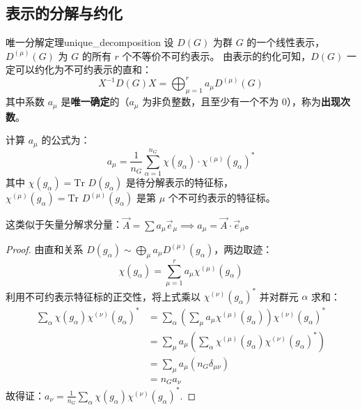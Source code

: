 \subsection{表示的分解与约化}

\begin{theorem}{唯一分解定理}{unique_decomposition}
    设 $D(G)$ 为群 $G$ 的一个线性表示，$D^{(\mu)}(G)$ 为 $G$ 的所有 $r$ 个不等价不可约表示。
    由表示的约化可知，$D(G)$ 一定可以约化为不可约表示的直和：
    \begin{equation}
        X^{-1}D(G)X = \bigoplus_{\mu=1}^r a_\mu D^{(\mu)}(G)
    \end{equation}
    其中系数 $a_\mu$ 是\textbf{唯一确定}的（$a_\mu$ 为非负整数，且至少有一个不为 0），称为\textbf{出现次数}。
    
    计算 $a_\mu$ 的公式为：
    \begin{equation}
        a_\mu = \frac{1}{n_G} \sum_{\alpha=1}^{n_G} \chi(g_\alpha) \cdot \chi^{(\mu)}(g_\alpha)^*
    \end{equation}
    其中 $\chi(g_\alpha) = \text{Tr } D(g_\alpha)$ 是待分解表示的特征标，$\chi^{(\mu)}(g_\alpha) = \text{Tr } D^{(\mu)}(g_\alpha)$ 是第 $\mu$ 个不可约表示的特征标。
    
    这类似于矢量分解求分量：$\vec{A} = \sum a_\mu \vec{e}_\mu \implies a_\mu = \vec{A} \cdot \vec{e}_\mu$。
\end{theorem}

\begin{proof}
    由直和关系 $D(g_\alpha) \sim \bigoplus_{\mu} a_\mu D^{(\mu)}(g_\alpha)$，两边取迹：
    \begin{equation}
        \chi(g_\alpha) = \sum_{\mu=1}^r a_\mu \chi^{(\mu)}(g_\alpha)
    \end{equation}
    利用不可约表示特征标的正交性，将上式乘以 $\chi^{(\nu)}(g_\alpha)^*$ 并对群元 $\alpha$ 求和：
    \begin{equation}
        \begin{aligned}
            \sum_{\alpha} \chi(g_\alpha) \chi^{(\nu)}(g_\alpha)^* &= \sum_{\alpha} \left( \sum_{\mu} a_\mu \chi^{(\mu)}(g_\alpha) \right) \chi^{(\nu)}(g_\alpha)^* \\
            &= \sum_{\mu} a_\mu \left( \sum_{\alpha} \chi^{(\mu)}(g_\alpha) \chi^{(\nu)}(g_\alpha)^* \right) \\
            &= \sum_{\mu} a_\mu (n_G \delta_{\mu\nu}) \\
            &= n_G a_\nu
        \end{aligned}
    \end{equation}
    故得证：$a_\nu = \frac{1}{n_G} \sum_{\alpha} \chi(g_\alpha) \chi^{(\nu)}(g_\alpha)^*$.
\end{proof}

